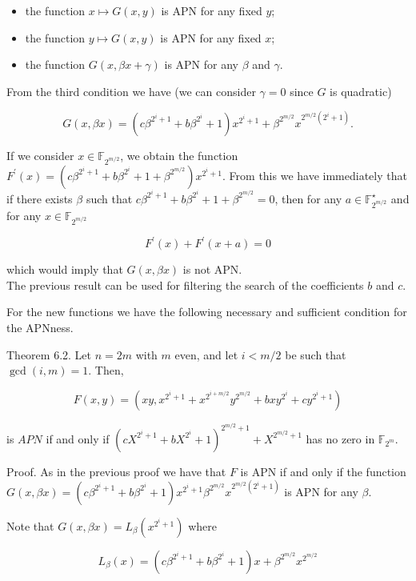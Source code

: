 \documentclass[10pt]{article}
\begin{document}
\begin{itemize}
  \item the function $x \mapsto G(x, y)$ is APN for any fixed $y$;
  \item the function $y \mapsto G(x, y)$ is APN for any fixed $x$;
  \item the function $G(x, \beta x+\gamma)$ is APN for any $\beta$ and $\gamma$.
\end{itemize}

From the third condition we have (we can consider $\gamma=0$ since $G$ is quadratic)

$$
G(x, \beta x)=\left(c \beta^{2^{i}+1}+b \beta^{2^{i}}+1\right) x^{2^{i}+1}+\beta^{2^{m / 2}} x^{2^{m / 2}\left(2^{i}+1\right)} .
$$

If we consider $x \in \mathbb{F}_{2^{m / 2}}$, we obtain the function $F^{\prime}(x)=\left(c \beta^{2^{i}+1}+b \beta^{2^{i}}+1+\right. \left.\beta^{2^{m / 2}}\right) x^{2^{i}+1}$. From this we have immediately that if there exists $\beta$ such that $c \beta^{2^{i}+1}+b \beta^{2^{i}}+1+\beta^{2^{m / 2}}=0$, then for any $a \in \mathbb{F}_{2^{m / 2}}^{\star}$ and for any $x \in \mathbb{F}_{2^{m / 2}}$

$$
F^{\prime}(x)+F^{\prime}(x+a)=0
$$

which would imply that $G(x, \beta x)$ is not APN.\\
The previous result can be used for filtering the search of the coefficients $b$ and $c$.

For the new functions we have the following necessary and sufficient condition for the APNness.

Theorem 6.2. Let $n=2 m$ with $m$ even, and let $i<m / 2$ be such that $\operatorname{gcd}(i, m)=1$. Then,

$$
F(x, y)=\left(x y, x^{2^{i}+1}+x^{2^{i+m / 2}} y^{2^{m / 2}}+b x y^{2^{i}}+c y^{2^{i}+1}\right)
$$

is $A P N$ if and only if $\left(c X^{2^{i}+1}+b X^{2^{i}}+1\right)^{2^{m / 2}+1}+X^{2^{m / 2}+1}$ has no zero in $\mathbb{F}_{2^{m}}$.

Proof. As in the previous proof we have that $F$ is APN if and only if the function $G(x, \beta x)=\left(c \beta^{2^{i}+1}+b \beta^{2^{i}}+1\right) x^{2^{i}+1} \beta^{2^{m / 2}} x^{2^{m / 2}\left(2^{i}+1\right)}$ is APN for any $\beta$.

Note that $G(x, \beta x)=L_{\beta}\left(x^{2^{i}+1}\right)$ where

$$
L_{\beta}(x)=\left(c \beta^{2^{i}+1}+b \beta^{2^{i}}+1\right) x+\beta^{2^{m / 2}} x^{2^{m / 2}}
$$
\end{document}
